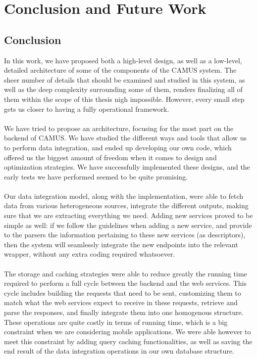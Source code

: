 \chapter{Conclusion and Future Work}
\label{capitolo8}
\thispagestyle{empty}
\section{Conclusion}
In this work, we have proposed both a high-level design, as well as a low-level, detailed architecture of some of the components of the CAMUS system. The sheer number of details that should be examined and studied in this system, as well as the deep complexity surrounding some of them, renders finalizing all of them within the scope of this thesis nigh impossible. However, every small step gets us closer to having a fully operational framework.\\\\
We have tried to propose an architecture, focusing for the most part on the backend of CAMUS. We have studied the different ways and tools that allow us to perform data integration, and ended up developing our own code, which offered us the biggest amount of freedom when it comes to design and optimization strategies. We have successfully implemented these designs, and the early tests we have performed seemed to be quite promising.\\\\
Our data integration model, along with the implementation, were able to fetch data from various heterogeneous sources, integrate the different outputs, making sure that we are extracting everything we need. Adding new services proved to be simple as well: if we follow the guidelines when adding a new service, and provide to the parsers the information pertaining to these new services (as descriptors), then the system will seamlessly integrate the new endpoints into the relevant wrapper, without any extra coding required whatsoever.\\\\
The storage and caching strategies were able to reduce greatly the running time required to perform a full cycle between the backend and the web services. This cycle includes building the requests that need to be sent, customizing them to match what the web services expect to receive in these requests, retrieve and parse the responses, and finally integrate them into one homogenous structure. These operations are quite costly in terms of running time, which is a big constraint when we are considering mobile applications. We were able however to meet this constraint by adding query caching functionalities, as well as saving the end result of the data integration operations in our own database structure.\\\\
